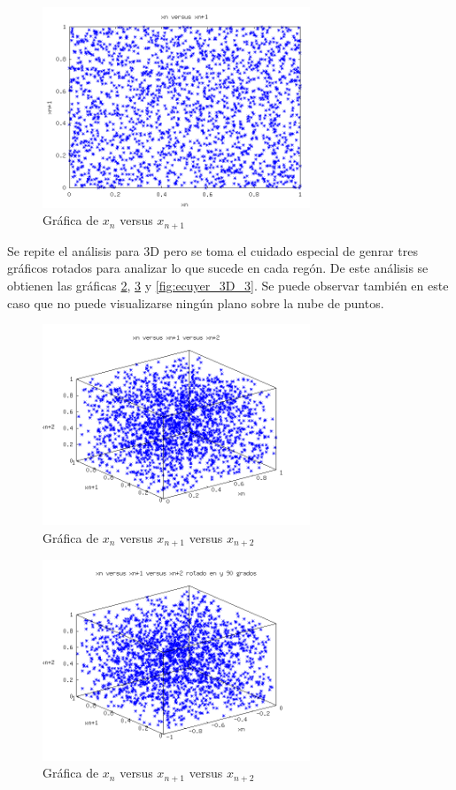 \documentclass{sig-alternate}
\begin{document}
\begin{figure}[ht]
\label{fig:ecuyer_2D}
\includegraphics[width=8cm]{ecuyer2D}
\caption{Gr\'afica de $x_{n}$ versus $x_{n+1}$}
\end{figure}

Se repite el an\'alisis para 3D pero se toma el cuidado especial de genrar tres gr\'aficos rotados
para analizar lo que sucede en cada reg\'on. De este an\'alisis se obtienen las gr\'aficas
\ref{fig:ecuyer_3D_1}, \ref{fig:ecuyer_3D_2} y \ref{fig:ecuyer_3D_3}. Se puede observar
tambi\'en en este caso que no puede visualizarse ning\'un plano sobre la nube de puntos. \\

\begin{figure}[ht]
\label{fig:ecuyer_3D_1}
\includegraphics[width=8cm]{ecuyer3D_1}
\caption{Gr\'afica de $x_{n}$ versus $x_{n+1}$ versus $x_{n+2}$}
\end{figure}

\begin{figure}[ht]
\label{fig:ecuyer_3D_2}
\includegraphics[width=8cm]{ecuyer3D_2}
\caption{Gr\'afica de $x_{n}$ versus $x_{n+1}$ versus $x_{n+2}$}
\end{figure}
\end{document}
